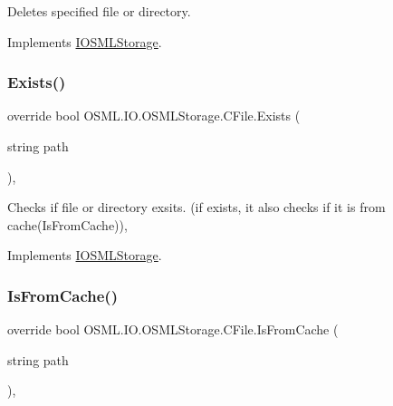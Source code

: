 Deletes specified file or directory. 



Implements \mbox{\hyperlink{classIOSMLStorage_aca08055c799d8c86bfdc427c54b92993}{I\+O\+S\+M\+L\+Storage}}.

\mbox{\label{classOSML_1_1IO_1_1OSMLStorage_1_1CFile_ab74c1d57146a48a39bffe7ba6853752c}} 
\subsubsection{\texorpdfstring{Exists()}{Exists()}}
{\footnotesize\ttfamily override bool O\+S\+M\+L.\+I\+O.\+O\+S\+M\+L\+Storage.\+C\+File.\+Exists (\begin{DoxyParamCaption}\item[{string}]{path }\end{DoxyParamCaption})\hspace{0.3cm}{\ttfamily [inline]}, {\ttfamily [virtual]}}



Checks if file or directory exsits. (if exists, it also checks if it is from cache(\+Is\+From\+Cache)), 



Implements \mbox{\hyperlink{classIOSMLStorage_adc2fa33637c24f1a5c7f3e9dc746c5c6}{I\+O\+S\+M\+L\+Storage}}.

\mbox{\label{classOSML_1_1IO_1_1OSMLStorage_1_1CFile_ac3c40ae47a8251eaafa0796b67d144c6}} 
\subsubsection{\texorpdfstring{IsFromCache()}{IsFromCache()}}
{\footnotesize\ttfamily override bool O\+S\+M\+L.\+I\+O.\+O\+S\+M\+L\+Storage.\+C\+File.\+Is\+From\+Cache (\begin{DoxyParamCaption}\item[{string}]{path }\end{DoxyParamCaption})\hspace{0.3cm}{\ttfamily [inline]}, {\ttfamily [virtual]}}



